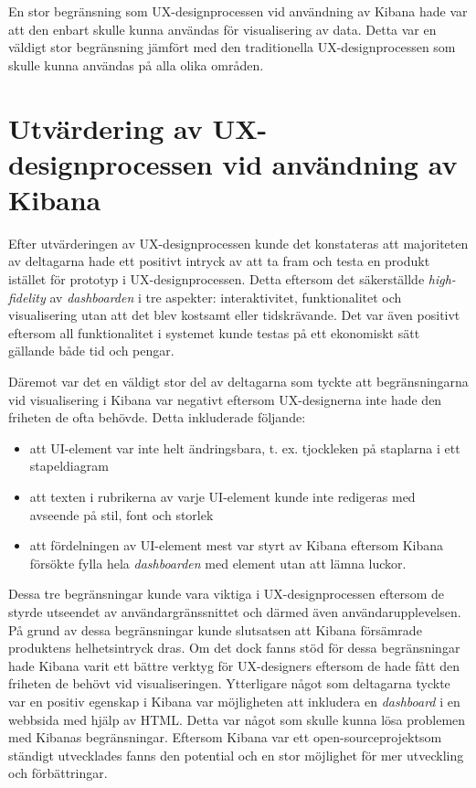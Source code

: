 \documentclass[12pt]{kththesis}
\begin{document}
En stor begränsning som UX-designprocessen vid användning av Kibana hade var att den enbart skulle kunna användas för visualisering av data. Detta var en väldigt stor begränsning jämfört med den traditionella UX-designprocessen som skulle kunna användas på alla olika områden. 

\section{Utvärdering av UX-designprocessen vid användning av Kibana}
Efter utvärderingen av UX-designprocessen kunde det konstateras att majoriteten av deltagarna hade ett positivt intryck av att ta fram och testa en produkt istället för prototyp i UX-designprocessen. Detta eftersom det säkerställde \textit{high-fidelity} av \textit{dashboarden} i tre aspekter: interaktivitet, funktionalitet och visualisering utan att det blev kostsamt eller tidskrävande. Det var även positivt eftersom all funktionalitet i systemet kunde testas på ett ekonomiskt sätt gällande både tid och pengar. 

Däremot var det en väldigt stor del av deltagarna som tyckte att begränsningarna vid visualisering i Kibana var negativt eftersom UX-designerna inte hade den friheten de ofta behövde. Detta inkluderade följande: 
\begin{itemize}
\item att UI-element var inte helt ändringsbara, t. ex. tjockleken på staplarna i ett stapeldiagram
\item att texten i rubrikerna av varje UI-element kunde inte redigeras med avseende på stil, font och storlek
\item att fördelningen av UI-element mest var styrt av Kibana eftersom Kibana försökte fylla hela \textit{dashboarden} med element utan att lämna luckor. 
\end{itemize}

Dessa tre begränsningar kunde vara viktiga i UX-designprocessen eftersom de styrde utseendet av användargränssnittet och därmed även användarupplevelsen. På grund av dessa begränsningar kunde slutsatsen att Kibana försämrade produktens helhetsintryck dras. Om det dock fanns stöd för dessa begränsningar hade Kibana varit ett bättre verktyg för UX-designers eftersom de hade fått den friheten de behövt vid visualiseringen. Ytterligare något som deltagarna tyckte var en positiv egenskap i Kibana var möjligheten att inkludera en \textit{dashboard} i en webbsida med hjälp av HTML. Detta var något som skulle kunna lösa problemen med Kibanas begränsningar. Eftersom Kibana var ett open-sourceprojektsom ständigt utvecklades fanns den potential och en stor möjlighet för mer utveckling och förbättringar.
\end{document}
